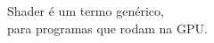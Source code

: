 \documentclass[preview]{standalone}
\begin{document}
Shader é um termo genérico,\\ para programas que rodam na GPU.\\
\end{document}
